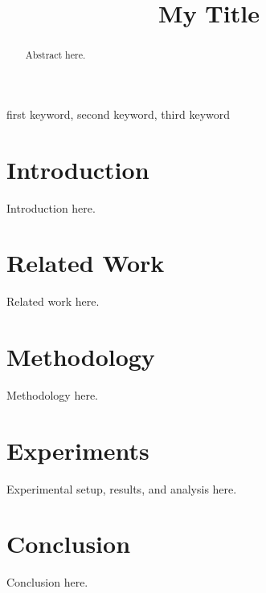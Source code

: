 \documentclass[conference]{IEEEtran}
\begin{document}
\title{My Title}

\author{
}

\maketitle

\begin{abstract}
Abstract here.
\end{abstract}

\begin{IEEEkeywords}
first keyword, second keyword, third keyword
\end{IEEEkeywords}

\section{Introduction}
\label{sec:intro}
Introduction here.

\section{Related Work}
\label{sec:related_work}
Related work here.

\section{Methodology}
\label{sec:method}
Methodology here.

\section{Experiments}
\label{sec:experiments}
Experimental setup, results, and analysis here.

\section{Conclusion}
\label{sec:conclusion}
Conclusion here.




\end{document}
